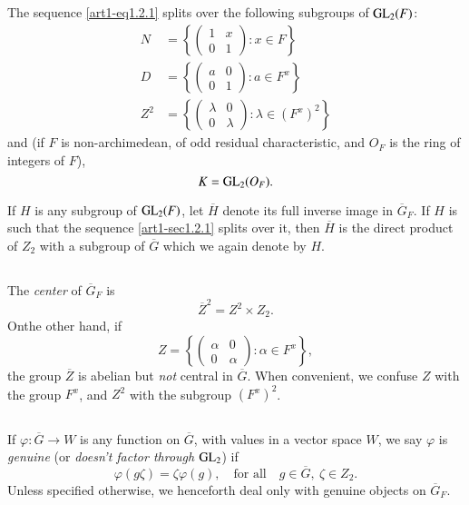 \subsection{}\label{art1-sec1.3}
The sequence \eqref{art1-eq1.2.1} splits over the following subgroups of $\mathrm{GL}_{2}(F)$:
\begin{align*}
N &= \left\{ \left(\begin{matrix} 1 & x\\ 0 & 1\end{matrix}\right):x\in F\right\}\\[4pt]
D &= \left\{ \left(\begin{matrix} a & 0\\ 0 & 1\end{matrix}\right):a\in F^{x}\right\}\\[4pt]
Z^{2} &= \left\{ \left(\begin{matrix} \lambda & 0\\ 0 & \lambda\end{matrix}\right):\lambda\in (F^{x})^{2}\right\}
\end{align*}
and (if $F$ is non-archimedean, of odd residual characteristic, and $O_{F}$ is the ring of integers of $F$),
$$
K=\mathrm{GL}_{2}(O_{F}).
$$

If $H$ is any subgroup of $\mathrm{GL}_{2}(F)$, let $\overline{H}$ denote its full inverse image in $\overline{G}_{F}$. If $H$ is such that the sequence \eqref{art1-sec1.2.1} splits over it, then $\overline{H}$ is the direct product of $Z_{2}$ with a subgroup of $\overline{G}$ which we again denote by $H$.

\subsection{}\label{art1-sec1.4}
The {\em center} of $\overline{G}_{F}$ is
$$
\overline{Z}^{2}=Z^{2}\times Z_{2}.
$$
\eject
\noindent
On\pageoriginale the other hand, if
$$
Z=\left\{\left(\begin{matrix} \alpha & 0\\ 0 & \alpha\end{matrix}\right):\alpha\in F^{x}\right\},
$$
the group $\overline{Z}$ is abelian but {\em not} central in $\overline{G}$. When convenient, we confuse $Z$ with the group $F^{x}$, and $Z^{2}$ with the subgroup $(F^{x})^{2}$.

\subsection{}\label{art1-sec1.5}
If $\varphi : \overline{G}\to W$ is any function on $\overline{G}$, with values in a vector space $W$, we say $\varphi$ is {\em genuine} (or {\em doesn't factor through} $\mathrm{GL}_{2}$) if 
$$
\varphi(g\zeta)=\zeta\varphi(g),\quad\text{for all}\quad g\in \overline{G}, \ \zeta\in Z_{2}.
$$
Unless specified otherwise, we henceforth deal only with genuine objects on $\overline{G}_{F}$.

